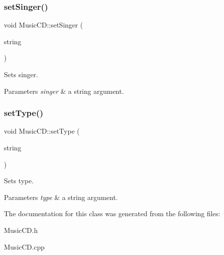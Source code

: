 \subsubsection{\texorpdfstring{set\+Singer()}{setSinger()}}
{\footnotesize\ttfamily void Music\+C\+D\+::set\+Singer (\begin{DoxyParamCaption}\item[{string}]{ }\end{DoxyParamCaption})}



Sets singer. 


\begin{DoxyParams}{Parameters}
{\em singer} & a string argument. \\
\hline
\end{DoxyParams}
\mbox{\label{classMusicCD_a1b1ea75abec58c4154dee842f9833995}} 
\subsubsection{\texorpdfstring{set\+Type()}{setType()}}
{\footnotesize\ttfamily void Music\+C\+D\+::set\+Type (\begin{DoxyParamCaption}\item[{string}]{ }\end{DoxyParamCaption})}



Sets type. 


\begin{DoxyParams}{Parameters}
{\em type} & a string argument. \\
\hline
\end{DoxyParams}


The documentation for this class was generated from the following files\+:\begin{DoxyCompactItemize}
\item 
Music\+C\+D.\+h\item 
Music\+C\+D.\+cpp\end{DoxyCompactItemize}
